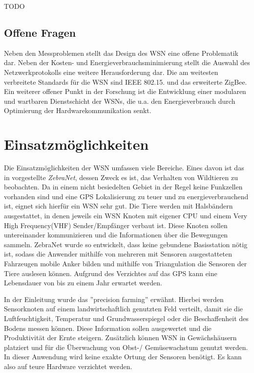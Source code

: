 \documentclass[12pt, a4wide]{scrreprt}
\begin{document}
TODO

\section{Offene Fragen}
Neben den Messproblemen stellt das Design des WSN eine offene Problematik dar. Neben der Kosten- und Energieverbrauchsminimierung stellt die Auswahl des Netzwerkprotokolls eine weitere Herausforderung dar. Die am weitesten verbreitete Standards für die WSN sind IEEE 802.15. und das erweiterte ZigBee\cite{patwari_locating}. Ein weiterer offener Punkt in der Forschung ist die Entwicklung einer modularen und wartbaren Dienstschicht der WSNs\cite{issues_wsn}, die u.a. den Energieverbrauch durch Optimierung der Hardwarekommunikation senkt.
\chapter{Einsatzmöglichkeiten}
Die Einsatzmöglichkeiten der WSN umfassen viele Bereiche. Eines davon ist das in \cite{zebranet} vorgestellte \textit{ZebraNet}, dessen Zweck es ist, das Verhalten von Wildtieren zu beobachten. Da in einem nicht besiedelten Gebiet in der Regel keine Funkzellen vorhanden sind und eine GPS Lokalisierung zu teuer und zu energieverbrauchend ist, eignet sich hierfür ein WSN sehr gut. Die Tiere werden mit Halsbändern ausgestattet, in denen jeweils ein WSN Knoten mit eigener CPU und einem Very High Frequency(VHF) Sender/Empfänger verbaut ist. Diese Knoten sollen untereinander kommunizieren und die Informationen über die Bewegungen sammeln. ZebraNet wurde so entwickelt, dass keine gebundene Basisstation nötig ist, sodass die Anwender mithilfe von mehreren mit Sensoren ausgestatteten Fahrzeugen mobile Anker bilden und mithilfe von Triangulation die Sensoren der Tiere auslesen können. Aufgrund des Verzichtes auf das GPS kann eine Lebensdauer von bis zu einem Jahr erwartet werden. 

In der Einleitung wurde das ''precision farming'' erwähnt. Hierbei werden Sensorknoten auf einem landwirtschaftlich genutzten Feld verteilt, damit sie die Luftfeuchtigkeit, Temperatur und Grundwasserspiegel oder die Beschaffenheit des Bodens messen können. Diese Information sollen ausgewertet und die Produktivität der Ernte steigern. Zusätzlich können WSN in Gewächshäusern\cite{horticulture} platziert und für die Überwachung von Obst-/ Gemüsewachstum genutzt werden. In dieser Anwendung wird keine exakte Ortung der Sensoren benötigt. Es kann also auf teure Hardware verzichtet werden.
\end{document}

